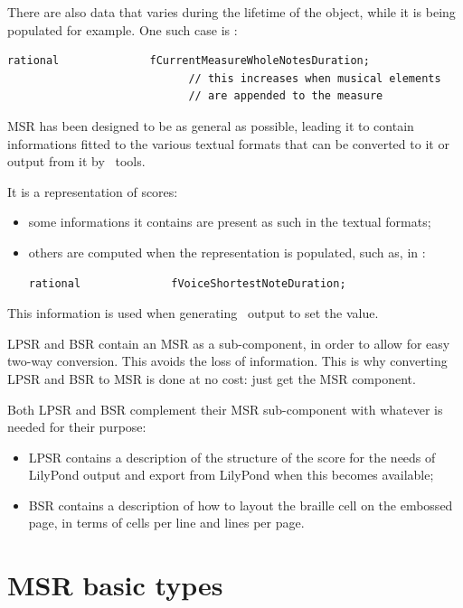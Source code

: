 There are also data that varies during the lifetime of the object, while it is being populated for example.
One such case is :
\begin{lstlisting}[language=CPlusPlus]
    rational              fCurrentMeasureWholeNotesDuration;
                            // this increases when musical elements
                            // are appended to the measure
\end{lstlisting}

MSR has been designed to be as general as possible, leading it to contain informations fitted to the various textual formats that can be converted to it or output from it by \mf\ tools.

It is a  representation of scores:
\begin{itemize}
\item some informations it contains are present as such in the textual formats;
\item others are computed when the representation is populated, such as, in :
\begin{lstlisting}[language=CPlusPlus]
    rational              fVoiceShortestNoteDuration;
\end{lstlisting}
\end{itemize}
This information is used when generating \mxml\ output to set the  value.

LPSR and BSR contain an MSR as a sub-component, in order to allow for easy two-way conversion. This avoids the loss of information. This is why converting LPSR and BSR to MSR is done at no cost: just get the MSR component.

Both LPSR and BSR complement their MSR sub-component with whatever is needed for their purpose:
\begin{itemize}
\item LPSR contains a description of the structure of the score for the needs of LilyPond output and export from LilyPond when this becomes available;  %
\item BSR contains a description of how to layout the braille cell on the embossed page, in terms of cells per line and lines per page.
\end{itemize}


\section{MSR basic types}\label{MSR basic types}

